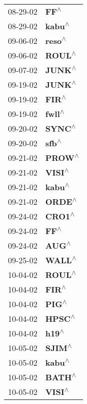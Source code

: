 \begin{supertabular}{p{0.08\textwidth}p{0.2\textwidth}}
 08-29-02 &      \textbf{FF\textsuperscript{$\wedge$}} \\
 08-29-02 &    \textbf{kabu\textsuperscript{$\wedge$}} \\
 09-06-02 &    \textbf{reso\textsuperscript{$\wedge$}} \\
 09-06-02 &    \textbf{ROUL\textsuperscript{$\wedge$}} \\
 09-07-02 &    \textbf{JUNK\textsuperscript{$\wedge$}} \\
 09-19-02 &    \textbf{JUNK\textsuperscript{$\wedge$}} \\
 09-19-02 &     \textbf{FIR\textsuperscript{$\wedge$}} \\
 09-19-02 &    \textbf{fwll\textsuperscript{$\wedge$}} \\
 09-20-02 &    \textbf{SYNC\textsuperscript{$\wedge$}} \\
 09-20-02 &     \textbf{sfb\textsuperscript{$\wedge$}} \\
 09-21-02 &    \textbf{PROW\textsuperscript{$\wedge$}} \\
 09-21-02 &    \textbf{VISI\textsuperscript{$\wedge$}} \\
 09-21-02 &    \textbf{kabu\textsuperscript{$\wedge$}} \\
 09-21-02 &    \textbf{ORDE\textsuperscript{$\wedge$}} \\
 09-24-02 &    \textbf{CRO1\textsuperscript{$\wedge$}} \\
 09-24-02 &      \textbf{FF\textsuperscript{$\wedge$}} \\
 09-24-02 &     \textbf{AUG\textsuperscript{$\wedge$}} \\
 09-25-02 &    \textbf{WALL\textsuperscript{$\wedge$}} \\
 10-04-02 &    \textbf{ROUL\textsuperscript{$\wedge$}} \\
 10-04-02 &     \textbf{FIR\textsuperscript{$\wedge$}} \\
 10-04-02 &     \textbf{PIG\textsuperscript{$\wedge$}} \\
 10-04-02 &    \textbf{HPSC\textsuperscript{$\wedge$}} \\
 10-04-02 &     \textbf{h19\textsuperscript{$\wedge$}} \\
 10-05-02 &    \textbf{SJIM\textsuperscript{$\wedge$}} \\
 10-05-02 &    \textbf{kabu\textsuperscript{$\wedge$}} \\
 10-05-02 &    \textbf{BATH\textsuperscript{$\wedge$}} \\
 10-05-02 &    \textbf{VISI\textsuperscript{$\wedge$}} \\

\end{supertabular}
